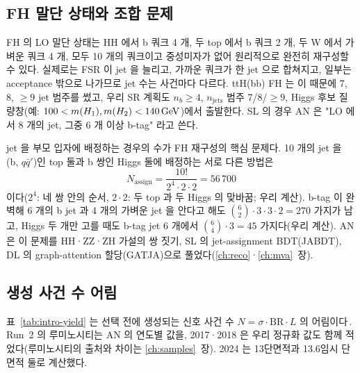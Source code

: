 \subsection{FH 말단 상태와 조합 문제}\label{sec:intro-combinatorics}

FH 의 LO 말단 상태는 HH 에서 b 쿼크 4 개, 두 top 에서 b 쿼크 2 개, 두 W 에서 가벼운 쿼크 4 개, 모두 10 개의 쿼크이고 중성미자가 없어 원리적으로
완전히 재구성할 수 있다. 실제로는 FSR 이 jet 을 늘리고, 가까운 쿼크가 한 jet 으로 합쳐지고, 일부는
acceptance 밖으로 나가므로 jet 수는 사건마다 다르다. ttH(bb) FH 는 이 때문에 7, 8, $\geq9$ jet 범주를 썼고,
우리 SR 계획도 $n_b\geq4$, $n_{\mathrm{jets}}$ 범주 7/8/$\geq9$, Higgs 후보 질량창(예: $100<m(H_1),m(H_2)<140\,\mathrm{GeV}$)에서 출발한다.
SL 의 경우 AN 은 "LO 에서 8 개의 jet, 그중 6 개 이상 b-tag" 라고 쓴다.

jet 을 부모 입자에 배정하는 경우의 수가 FH 재구성의 핵심 문제다. 10 개의 jet 을 (b, $q\bar q'$)인 top 둘과 b 쌍인 Higgs 둘에 배정하는 서로 다른 방법은
\begin{equation}
  N_{\mathrm{assign}} = \frac{10!}{2^{4}\cdot2\cdot2} = 56\,700
  \label{eq:intro-comb}
\end{equation}
이다($2^4$: 네 쌍 안의 순서, $2\cdot2$: 두 top 과 두 Higgs 의 맞바꿈; 우리 계산). b-tag 이 완벽해 6 개의 b jet 과 4 개의 가벼운 jet 을 안다고 해도
$\binom{6}{2}\cdot3\cdot3\cdot2=270$ 가지가 남고, Higgs 두 개만 고를 때도 b-tag jet 6 개에서 $\binom{6}{4}\cdot3=45$ 가지다(우리 계산). AN 은 이 문제를 HH·ZZ·ZH
가설의 \chisq 쌍 짓기, SL 의 jet-assignment BDT(JABDT), DL 의 graph-attention 할당(GATJA)으로 풀었다(\ref{ch:reco}·\ref{ch:mva}~장).

\subsection{생성 사건 수 어림}\label{sec:intro-yield}

표~\ref{tab:intro-yield} 는 선택 전에 생성되는 신호 사건 수 $N=\sigma\cdot\mathrm{BR}\cdot L$ 의 어림이다\,\tagours. Run~2 의 루미노시티는 AN 의 연도별 값을,
2017·2018 은 우리 정규화 값도 함께 적었다(루미노시티의 출처와 차이는 \ref{ch:samples}~장). 2024 는 13\TeV 단면적과 13.6\TeV 임시 단면적 둘로 계산했다.


